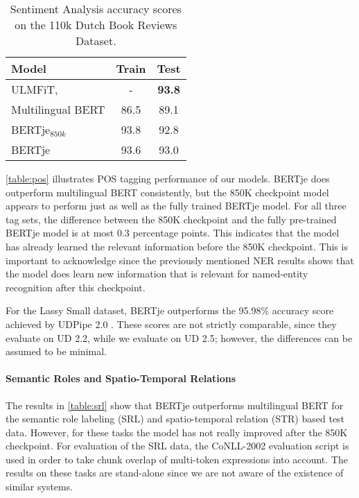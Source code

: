 \documentclass[11pt]{article}
\begin{document}
\begin{table}[H]
\begin{center}
  \begin{tabular}{l || c c}
    \toprule
    Model             & Train & Test \\
    \midrule
    ULMFiT, \citet{burgh2019merits} & -   & \textbf{93.8} \\
    \midrule
    Multilingual BERT & 86.5 & 89.1 \\
    BERTje$_{850k}$   & 93.8 & 92.8 \\
    BERTje            & 93.6 & 93.0 \\
    \bottomrule
  \end{tabular}
   \caption{\label{table:sent}Sentiment Analysis accuracy scores on the 110k Dutch Book Reviews Dataset.}
\end{center}
\end{table}

\autoref{table:pos} illustrates POS tagging performance of our models. BERTje does outperform multilingual BERT consistently, but the 850K checkpoint model appears to perform just as well as the fully trained BERTje model.
For all three tag sets, the difference between the 850K checkpoint and the fully pre-trained BERTje model is at most 0.3 percentage points.
This indicates that the model has already learned the relevant information before the 850K checkpoint.
This is important to acknowledge since the previously mentioned NER results shows that the model does learn new information that is relevant for named-entity recognition after this checkpoint.

For the Lassy Small dataset, BERTje outperforms the 95.98\% accuracy score achieved by UDPipe 2.0 \citep{straka2018udpipe}.
These scores are not strictly comparable, since they evaluate on UD 2.2, while we evaluate on UD 2.5; however, the differences can be assumed to be minimal.

\paragraph{Semantic Roles and Spatio-Temporal Relations}



The results in \autoref{table:srl} show that BERTje outperforms multilingual BERT for the semantic role labeling (SRL) and spatio-temporal relation (STR) based test data.
However, for these tasks the model has not really improved after the 850K checkpoint. 
For evaluation of the SRL data, the CoNLL-2002 evaluation script is used in order to take chunk overlap of multi-token expressions into account.
The results on these tasks are stand-alone since we are not aware of the existence of similar systems.
\end{document}
